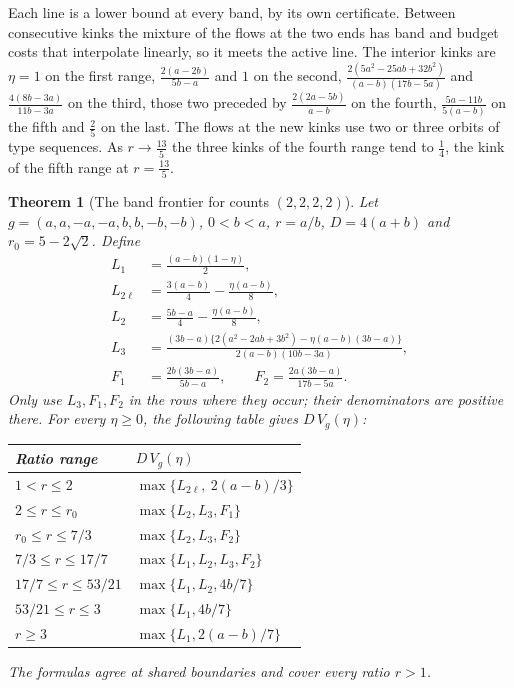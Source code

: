 \documentclass[conference]{IEEEtran}
\newtheorem{theorem}{Theorem}
\theoremstyle{definition}
\begin{document}
Each line is a lower bound at every band, by its own certificate. Between consecutive kinks the
mixture of the flows at the two ends has band and budget costs that interpolate linearly, so it
meets the active line. The interior kinks are $\eta=1$ on the first range,
$\frac{2(a-2b)}{5b-a}$ and $1$ on the second, $\frac{2(5a^2-25ab+32b^2)}{(a-b)(17b-5a)}$ and $\frac{4(8b-3a)}{11b-3a}$ on the third, those two
preceded by $\frac{2(2a-5b)}{a-b}$ on the fourth, $\frac{5a-11b}{5(a-b)}$ on the fifth and $\frac25$ on
the last. The flows at the new kinks use two or three orbits of type sequences. As $r\to\frac{13}5$
the three kinks of the fourth range tend to $\frac14$, the kink of the fifth range at $r=\frac{13}5$.


\begin{theorem}[The band frontier for counts $(2,2,2,2)$]
\label{thm:twomag2222}
Let $g=(a,a,-a,-a,b,b,-b,-b)$, $0<b<a$, $r=a/b$, $D=4(a+b)$ and
$r_0=5-2\sqrt2$. Define
\begin{align*}
L_1&=\frac{(a-b)(1-\eta)}2,\\
L_{2\ell}&=\frac{3(a-b)}4-\frac{\eta(a-b)}8,\\
L_2&=\frac{5b-a}4-\frac{\eta(a-b)}8,\\
L_3&=\frac{(3b-a)\{2(a^2-2ab+3b^2)-\eta(a-b)(3b-a)\}}
{2(a-b)(10b-3a)},\\
F_1&=\frac{2b(3b-a)}{5b-a},\qquad
F_2=\frac{2a(3b-a)}{17b-5a}.
\end{align*}
Only use $L_3,F_1,F_2$ in the rows where they occur; their denominators are positive there.
For every $\eta\ge0$, the following table gives $D\,V_g(\eta)$:
\begin{center}
\footnotesize
\begin{tabular}{@{}ll@{}}
\toprule
Ratio range & $D\,V_g(\eta)$ \\
\midrule
$1<r\le2$ & $\max\{L_{2\ell},\ 2(a-b)/3\}$ \\
$2\le r\le r_0$ & $\max\{L_2,L_3,F_1\}$ \\
$r_0\le r\le7/3$ & $\max\{L_2,L_3,F_2\}$ \\
$7/3\le r\le17/7$ & $\max\{L_1,L_2,L_3,F_2\}$ \\
$17/7\le r\le53/21$ & $\max\{L_1,L_2,4b/7\}$ \\
$53/21\le r\le3$ & $\max\{L_1,4b/7\}$ \\
$r\ge3$ & $\max\{L_1,2(a-b)/7\}$ \\
\bottomrule
\end{tabular}
\end{center}
The formulas agree at shared boundaries and cover every ratio $r>1$.
\end{theorem}
\end{document}
